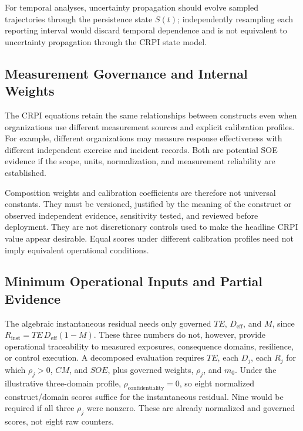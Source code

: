 \documentclass[11pt]{article}
\begin{document}
For temporal analyses, uncertainty propagation should evolve sampled trajectories through
the persistence state $S(t)$; independently resampling each reporting interval would
discard temporal dependence and is not equivalent to uncertainty propagation through the
CRPI state model.

\subsection{Measurement Governance and Internal Weights}
The CRPI equations retain the same relationships between
constructs even when organizations use different measurement
sources and explicit calibration profiles. For example,
different organizations may measure response effectiveness with
different independent exercise and incident records. Both are
potential SOE evidence if the scope, units, normalization,
and measurement reliability are established.

Composition weights and calibration coefficients are therefore
not universal constants. They must be versioned, justified by
the meaning of the construct or observed independent evidence,
sensitivity tested, and reviewed before deployment. They are
not discretionary controls used to make the headline CRPI
value appear desirable. Equal scores under different calibration
profiles need not imply equivalent operational conditions.



\subsection{Minimum Operational Inputs and Partial Evidence}
\label{sec:minimal-operational-inputs}

The algebraic instantaneous residual needs only governed $TE$, $D_{\mathrm{eff}}$,
and $M$, since $R_{\mathrm{inst}}=TE\,D_{\mathrm{eff}}(1-M)$. These three
numbers do not, however, provide operational traceability to measured
exposures, consequence domains, resilience, or control execution. A decomposed
evaluation requires $TE$, each $D_j$, each $R_j$ for which $\rho_j>0$,
$CM$, and $SOE$, plus governed weights, $\rho_j$, and $m_0$. Under the
illustrative three-domain profile, $\rho_{\mathrm{confidentiality}}=0$,
so eight normalized construct/domain scores suffice for the instantaneous
residual. Nine would be required if all three $\rho_j$ were nonzero.
These are already normalized and governed scores, not eight raw counters.
\end{document}
